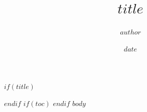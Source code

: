 \documentclass[10pt,a4paper]{article}
\title{$title$}
\author{$author$}
\date{$date$}
\begin{document}
$if(title)$
\maketitle
$endif$
$if(toc)$
\tableofcontents
\newpage
$endif$
$body$
\end{document}
